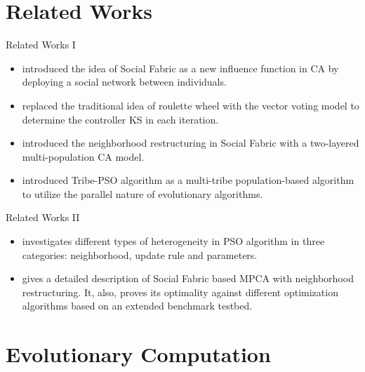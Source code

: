 \documentclass[table]{beamer}
\begin{document}
	\section{Related Works}
	
	\begin{frame}{Related Works I}
			\begin{itemize}
				\justifying
				\item \cite{R:1} introduced the idea of Social Fabric as a new influence function in CA by deploying a social network between individuals.
				\item \cite{che2010robust} replaced the traditional idea of roulette wheel with the vector voting model to determine the controller KS in each iteration.
				\item \cite{ali2012socio} introduced the neighborhood restructuring in Social Fabric with a two-layered multi-population CA model.
				\item \cite{chen2006tribe} introduced Tribe-PSO algorithm as a multi-tribe population-based algorithm to utilize the parallel nature of evolutionary algorithms.
			\end{itemize}
	\end{frame}
	
	\begin{frame}{Related Works II}
		\begin{itemize}
			\justifying
			\item \cite{de2009heterogeneous} investigates different types of heterogeneity in PSO algorithm in three categories: neighborhood, update rule and parameters.
			\item \cite{ali2016leveraged} gives a detailed description of Social Fabric based MPCA with neighborhood restructuring. It, also, proves its optimality against different optimization algorithms based on an extended benchmark testbed.
		\end{itemize}
	\end{frame}
	
	\section{Evolutionary Computation}
	
\end{document}
